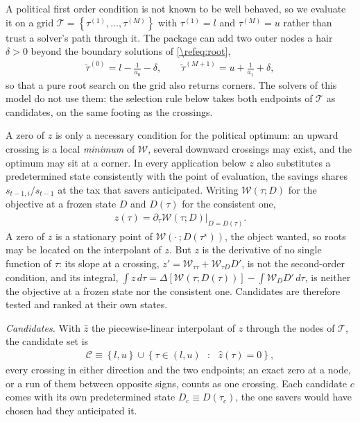 A political first order condition is not known to be well behaved, so we evaluate it on a grid $\mathcal{T} = \left\lbrace \tau^{(1)},...,\tau^{(M)}\right\rbrace$ with $\tau^{(1)} = l$ and $\tau^{(M)} = u$ rather than trust a solver's path through it. The package can add two outer nodes a hair $\delta>0$ beyond the boundary solutions of \eqref{\refeq:root},
\begin{align}\label{\refeq:extendedGrid}
    \tilde{\tau}^{(0)} = l-\frac{1}{a_0}-\delta, \qquad \tilde{\tau}^{(M+1)} = u+\frac{1}{a_1}+\delta,
\end{align}
so that a pure root search on the grid also returns corners. The solvers of this model do not use them: the selection rule below takes both endpoints of $\mathcal{T}$ as candidates, on the same footing as the crossings.

A zero of $z$ is only a necessary condition for the political optimum: an upward crossing is a local \emph{minimum} of $\mathcal{W}$, several downward crossings may exist, and the optimum may sit at a corner. In every application below $z$ also substitutes a predetermined state consistently with the point of evaluation, the savings shares $s_{t-1,i}/s_{t-1}$ at the tax that savers anticipated. Writing $\mathcal{W}(\tau; D)$ for the objective at a frozen state $D$ and $D(\tau)$ for the consistent one,
\begin{align}\label{\refeq:consistentFOC}
    z(\tau) = \partial_{\tau}\mathcal{W}\left(\tau; D\right)\big|_{D = D(\tau)}.
\end{align}
A zero of $z$ is a stationary point of $\mathcal{W}(\cdot\,; D(\tau^{\star}))$, the object wanted, so roots may be located on the interpolant of $z$. But $z$ is the derivative of no single function of $\tau$: its slope at a crossing, $z' = \mathcal{W}_{\tau\tau} + \mathcal{W}_{\tau D}D'$, is not the second-order condition, and its integral, $\int z\,d\tau = \Delta\left[\mathcal{W}(\tau;D(\tau))\right] - \int \mathcal{W}_D D'\,d\tau$, is neither the objective at a frozen state nor the consistent one. Candidates are therefore tested and ranked at their own states.

\emph{Candidates.} With $\hat{z}$ the piecewise-linear interpolant of $z$ through the nodes of $\mathcal{T}$, the candidate set is
\begin{align}\label{\refeq:candidates}
    \mathcal{C} \equiv \left\lbrace l,u \right\rbrace\cup\left\lbrace \tau\in(l,u)\mbox{ }:\mbox{ }\hat{z}(\tau) = 0\right\rbrace,
\end{align}
every crossing in either direction and the two endpoints; an exact zero at a node, or a run of them between opposite signs, counts as one crossing. Each candidate $c$ comes with its own predetermined state $D_c \equiv D(\tau_c)$, the one savers would have chosen had they anticipated it.

